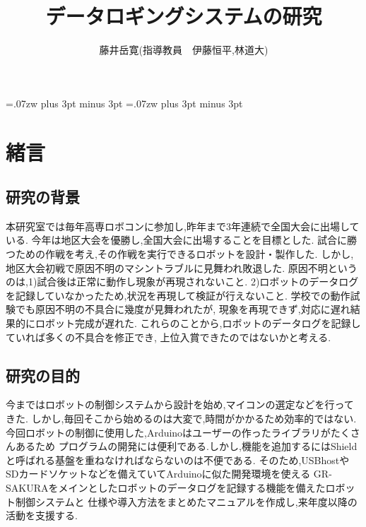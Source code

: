 \documentclass[twocolumn,11pt]{abst}
\title{データロギングシステムの研究}
\author{藤井岳寛(指導教員　伊藤恒平,林道大)}
\begin{document}
\maketitle
\thispagestyle{fancy}
\pagestyle{fancy}

\setlength{\baselineskip}{5.6truemm}
\kanjiskip=.07zw plus 3pt minus 3pt
\xkanjiskip=.07zw plus 3pt minus 3pt



\section{緒言}
\subsection{研究の背景}
本研究室では毎年高専ロボコンに参加し,昨年まで3年連続で全国大会に出場している.
今年は地区大会を優勝し,全国大会に出場することを目標とした.
試合に勝つための作戦を考え,その作戦を実行できるロボットを設計・製作した.
しかし,地区大会初戦で原因不明のマシントラブルに見舞われ敗退した.
原因不明というのは,1)試合後は正常に動作し現象が再現されないこと.
2)ロボットのデータログを記録していなかったため,状況を再現して検証が行えないこと.
学校での動作試験でも原因不明の不具合に幾度が見舞われたが,
現象を再現できず,対応に遅れ結果的にロボット完成が遅れた.
これらのことから,ロボットのデータログを記録していれば多くの不具合を修正でき,
上位入賞できたのではないかと考える.


\subsection{研究の目的}
今まではロボットの制御システムから設計を始め,マイコンの選定などを行ってきた.
しかし,毎回そこから始めるのは大変で,時間がかかるため効率的ではない.
今回ロボットの制御に使用した,Arduinoはユーザーの作ったライブラリがたくさんあるため
プログラムの開発には便利である.しかし,機能を追加するにはShieldと呼ばれる基盤を重ねなければならないのは不便である.
そのため,USBhostやSDカードソケットなどを備えていてArduinoに似た開発環境を使える
GR-SAKURAをメインとしたロボットのデータログを記録する機能を備えたロボット制御システムと
仕様や導入方法をまとめたマニュアルを作成し,来年度以降の活動を支援する.
\end{document}
